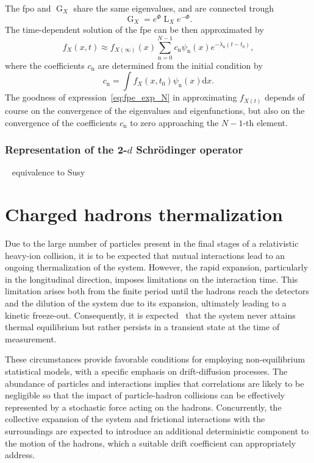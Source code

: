 \documentclass[a4paper,12pt]{book}
\begin{document}
The \acrshort{fpo} and $\operatorname{G}_{X}$ share the same eigenvalues, and are connected trough 
\begin{equation}
    \operatorname{G}_{X} = e^{\Phi} \operatorname{L}_{X} e^{-\Phi}.
\end{equation}
The time-dependent solution of the \acrshort{fpe} can be then approximated by 
\begin{equation}
\label{eq:fpe_exp_N}
    f_{X}(x,t) \approx  f_{X(\infty)}(x) \sum_{\text{n}=0}^{N-1} c_\text{n} \psi_\text{n}(x) e^{-\lambda_\text{n} (t-t_0)}, 
\end{equation}
where the coefficients $c_\text{n}$ are determined from the initial condition by
\begin{equation}
    c_\text{n} = \int f_{X}(x,t_0) \psi_\text{n}(x) \mathrm{d}x.
\end{equation}
The goodness of expression~\eqref{eq:fpe_exp_N} in approximating $f_{X(t)}$ depends of course on the convergence of the eigenvalues and eigenfunctions, but also on the convergence of the coefficients $c_\text{n}$ to zero approaching the $N-1$-th element. 


\subsection{Representation of the 2-$d$ Schrödinger operator}

~\parencite{shizgal1996}
equivalence to Susy~\parencite{Shizgal2016}

\chapter{Charged hadrons thermalization}\label{chap:particle_therm}

Due to the large number of particles present in the final stages of a relativistic heavy-ion
collision, it is to be expected that mutual interactions lead to an ongoing thermalization of
the system. However, the rapid expansion, particularly in the longitudinal direction, imposes limitations on the interaction time. This limitation arises both from the finite period until the hadrons reach the detectors and the dilution of the system due to its expansion, ultimately leading to a kinetic freeze-out. Consequently, it is expected~\parencite{Wolschin2006} that the system never attains thermal equilibrium but rather persists in a transient state at the time of measurement.

These circumstances provide favorable conditions for employing non-equilibrium statistical models, with a specific emphasis on drift-diffusion processes. The abundance of particles and interactions implies that correlations are likely to be negligible so that the impact of particle-hadron collisions can be effectively represented by a stochastic force acting on the hadrons. Concurrently, the collective expansion of the system and frictional interactions with the surroundings are expected to introduce an additional deterministic component to the motion of the hadrons, which a suitable drift coefficient can appropriately address.
\end{document}
